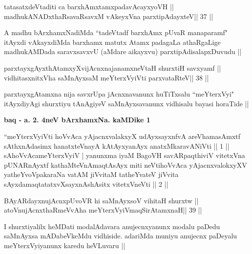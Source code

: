\begin{shl}
tatasatxdeVtaditi ca barxhAmxtamxpadavAcayxyoVH ||
madhukANADxthaRsavaRsavxM vAkeyxVna parxtipAdayxteV\hfill || 37 ||
\end{shl}

\begin{artha}
A madhu bArxhamxNadiMda ``tadeVtadf barxhAmx pUvaR manaparamf" itAyxdi
vAkayxdiMda barxhamx matutx Atamx padagaLa athaRgaLige madhukAMDada
saravxsavxvU (aMdare aikayxvu) parxtipAdisalapxDuvudu ||
\end{artha}


\begin{shl}
parxtayxgAyxthAtamxyXvijAcnxnajanamxneV\s taH shurxtiH savxyamf ||
vidhitasxnitxVha saMnAyxsaM meYterxVyiVti parxvataRteV\hfill || 38 ||
\end{shl}

\begin{artha}
parxtayxgAtamxna nija savxrUpa jAcnxnavanunx huTiTxsalu ``meYterxVyi"
itAyxdiyAgi shurxtiyu tAnAgiyeV saMnAyxsavanunx vidhisalu bayasi
horaTide ||
\end{artha}

\begin{center}
\textbf{baq - a. 2. 4neV bArxhamxNa. kaMDike 1}
\end{center}

\begin{shl}
``meYterxVyiVti hoVvAca yAjacnxvalakxyX udAyxsayxnfvA 
areV\s hamasAmxtf sAthxnAdasimx hanatxteV\s nayA
kAtAyxyanAyx anatxMkaravANiVti || 1 ||
sAhoVvAcameYterxVyiV | yanunxma iyaM BagoVH
savARpaqthiviV vitetxVna pUNARnAyxtf kathaMteVnA\s maqtAsAyx
miti neVtihoVvAca yAjacnxvalokxyXV yatheYvoVpakaraNa
vatAM jiVvitaM tatheYvateV jiVvita sAyxdamaqtatatxvXsayxnAshAsitx
vitetxVneVti || 2 ||
\end{shl}


\begin{shl}
BAyARdayxnujAcnxpUvoVR hi saMnAyxsoV vihitaH shurxtw ||
atoV\s nujAcnxthaRmeVvA\s\s ha meYterxVyiVmaqSirAtamxnaH\hfill || 39 ||
\end{shl}

\begin{artha}
I shurxtiyalilx heMDati modalAdavara anujecnxyanunx modalu paDedu
saMnAyxsa mADabeVkeMdu vidhiside. adariMda muniyu anujecnx paDeyalu
meYterxVyiyanunx karedu heVLuvaru ||
\end{artha}

